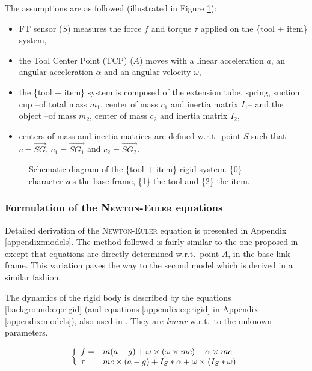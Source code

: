 \documentclass[/home/francois/latex/report/main.tex]{subfiles}
\begin{document}
The assumptions are as followed (illustrated in Figure \ref{fig:tikz:one_body}):

\begin{itemize}
 \item \ac{FT} sensor ($S$) measures the force $f$ and torque $\tau$ applied on the \{tool + item\} system,
 \item the Tool Center Point (TCP) ($A$) moves with a linear acceleration $a$, an angular acceleration $\alpha$ and an angular velocity $\omega$,
 \item the \{tool + item\} system is composed of the extension tube, spring, suction cup –of total mass $m_1$, center of mass $c_1$ and inertia matrix $I_1$– and the object –of mass $m_2$, center of mass $c_2$ and inertia matrix $I_2$,
 \item centers of mass and inertia matrices are defined w.r.t.\ point $S$ such that $c = \overrightarrow{SG}$, $c_1 = \overrightarrow{SG_1}$ and $c_2 = \overrightarrow{SG_2}$.
\end{itemize}

\begin{figure}[h]
\centering
   \caption{Schematic diagram of the \{tool + item\} rigid system. \{0\} characterizes the base frame, \{1\} the tool and \{2\} the item.}
   \label{fig:tikz:one_body}
\end{figure}

\subsubsection{Formulation of the \textsc{Newton-Euler} equations}
\label{subsubsection:background_newton_equation}

Detailed derivation of the \textsc{Newton-Euler} equation is presented in Appendix \ref{appendix:models}. The method followed is fairly similar to the one proposed in \cite{An1985} except that equations are directly determined w.r.t.\ point $A$, in the base link frame. This variation paves the way to the second model which is derived in a similar fashion.

The dynamics of the rigid body is described by the equations \ref{background:eq:rigid} (and equations \ref{appendix:eq:rigid} in Appendix \ref{appendix:models}), also used in \cite{Kubus2008, Kubus2007, Kubus2014, Farsoni2018}. They are \textit{linear} w.r.t.\ to the unknown parameters.

\begin{equation}
 \label{background:eq:rigid}
 \left \{
 \begin{array}{l l}
  f =    & m (a - g) + \omega \times (\omega \times m c) + \alpha \times m c \\
  \tau = & m c \times (a - g)
  + I_{S} \ast \alpha + \omega \times (I_{S} \ast \omega)
 \end{array}
 \right.
\end{equation}
\end{document}
